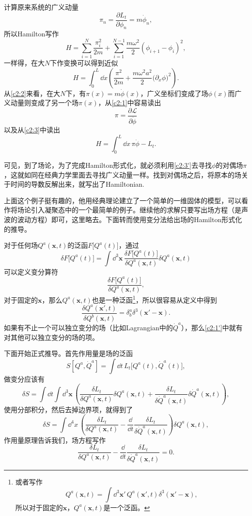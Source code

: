 计算原来系统的广义动量
\begin{equation}
	\pi_n=\frac{\partial L_t}{\partial \phi_n}=m\dot{\phi}_n,
	\label{c2:2}
\end{equation}
所以Hamilton写作
\[
	H=\sum_{i=1}^N\frac{\pi_i^2}{2m}+\sum_{i=1}^{N-1}\frac{m\omega^2}{2}(\phi_{i+1}-\phi_i)^2,
\]
一样得，在大$N$下作变换可以得到近似
\begin{equation}
	H=\int_0^L \dd x\left(\frac{\pi^2}{2m}+\frac{m\omega^2a^2}{2}\bigl(\partial_x \phi\bigr)^2\right).
	\label{c2:3}
\end{equation}
从\eqref{c2:2}来看，在大$N$下，有$\pi(x)=m\dot{\phi}(x)$，广义坐标们变成了场$\phi(x)$而广义动量则变成了另一个场$\pi(x)$，从\eqref{c2:1}中容易读出
\begin{equation}
	\pi=\frac{\partial \mathcal{L}}{\partial \dot{\phi}}
	\label{c2:3'}
\end{equation}
以及从\eqref{c2:3}中读出
\[
	H=\int_0^L \dd x \,\pi \dot{\phi}-L_t.
\]

可见，到了场论，为了完成Hamilton形式化，就必须利用\eqref{c2:3'}去寻找$\phi$的对偶场$\pi$，这就如同在经典力学里面去寻找广义动量一样。找到对偶场之后，将原本的场关于时间的导数反解出来，就写出了Hamiltonian.

上面这个例子挺有趣的，他用经典理论建立了一个简单的一维固体的模型，可以看作将场论引入凝聚态中的一个最简单的例子。继续他的求解只要写出场方程（是声波的波动方程）即可，这里略去。下面转而使用变分法给出场的Hamilton形式化的推导。

对于任何场$Q^a(\bm{x},t)$的泛函$F\bigl[Q^a(t)\bigr]$，通过
\[
	\delta F\bigl[Q^a(t)\bigr]=\int \dd^3 \bm{x}\, \frac{\delta F\bigl[Q^a(t)\bigr]}{\delta Q^a(\bm{x},t)}\delta Q^a(\bm{x},t)
\]
可以定义变分算符
\begin{equation}
	\frac{\delta F\bigl[Q^a(t)\bigr]}{\delta Q^a(\bm{x},t)},
	\label{c2:1'}
\end{equation}
对于固定的$\bm{x}$，那么$Q^a(\bm{x},t)$也是一种泛函\footnote{或者写作
\[
	Q^a(\bm{x},t)=\int \dd^3 \bm{x}'\,Q^a(\bm{x}',t)\delta^3(\bm{x}'-\bm{x}),
\]
所以对于固定的$\bm{x}$，$Q^a(\bm{x},t)$是一个泛函。}，所以很容易从定义中得到
\[
	\frac{\delta Q^a(\bm{x}',t)}{\delta Q^b(\bm{x},t)}=\delta^a_b\delta^3(\bm{x}'-\bm{x}).
\]
如果有不止一个可以独立变分的场（比如Lagrangian中的$\dot{Q}^a$），那么\eqref{c2:1'}中就有对其他可以独立变分的场的项。

下面开始正式推导。首先作用量是场的泛函
\[
	S[Q^a,\dot{Q}^a]=\int \dd t \,L_t\bigl[Q^a(t),\dot{Q}^a(t)\bigr],
\]
做变分应该有
\[
	\delta S=\int \dd t \int \dd^3 \bm{x}\,\left(\frac{\delta L_t}{\delta Q^a(\bm{x},t)}\delta Q^a(\bm{x},t)+\frac{\delta L_t}{\delta \dot{Q}^a(\bm{x},t)}\delta \dot{Q}^a(\bm{x},t)\right),
\]
使用分部积分，然后去掉边界项，就得到了
\[
	\delta S=\int \dd^4 x\,\left(\frac{\delta L_t}{\delta Q^a(\bm{x},t)}-\frac{\dd}{\dd t}\frac{\delta L_t}{\delta \dot{Q}^a(\bm{x},t)}\right)\delta Q^a(\bm{x},t),
\]
作用量原理告诉我们，场方程写作
\begin{equation}
	\frac{\delta L_t}{\delta Q^a(\bm{x},t)}-\frac{\dd}{\dd t}\frac{\delta L_t}{\delta \dot{Q}^a(\bm{x},t)}=0.
	\label{c2:6}
\end{equation}


